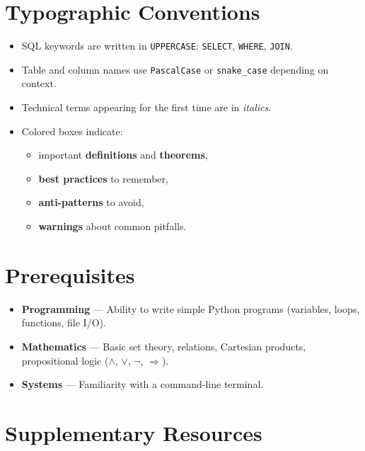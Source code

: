 \section*{Typographic Conventions}

\begin{itemize}
    \item SQL keywords are written in \texttt{UPPERCASE}:
          \texttt{SELECT}, \texttt{WHERE}, \texttt{JOIN}.
    \item Table and column names use \texttt{PascalCase} or
          \texttt{snake\_case} depending on context.
    \item Technical terms appearing for the first time are in \emph{italics}.
    \item Colored boxes indicate:
          \begin{itemize}
              \item important \textbf{definitions} and \textbf{theorems},
              \item \textbf{best practices} to remember,
              \item \textbf{anti-patterns} to avoid,
              \item \textbf{warnings} about common pitfalls.
          \end{itemize}
\end{itemize}

\section*{Prerequisites}

\begin{itemize}
    \item \textbf{Programming} --- Ability to write simple Python programs
          (variables, loops, functions, file I/O).
    \item \textbf{Mathematics} --- Basic set theory, relations, Cartesian
          products, propositional logic
          ($\land$, $\lor$, $\neg$, $\Rightarrow$).
    \item \textbf{Systems} --- Familiarity with a command-line terminal.
\end{itemize}

\section*{Supplementary Resources}

